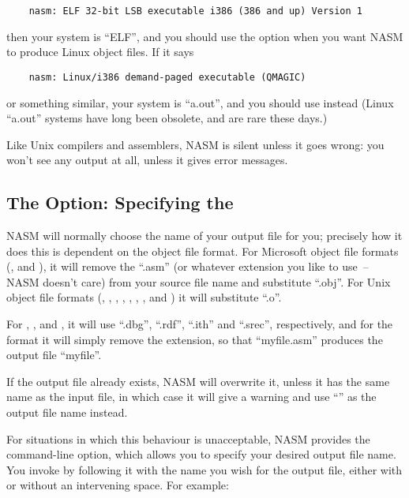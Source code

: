 \begin{lstlisting}
	nasm: ELF 32-bit LSB executable i386 (386 and up) Version 1
\end{lstlisting}

then your system is ``ELF'', and you should use the option 
when you want NASM to produce Linux object files. If it says

\begin{lstlisting}
	nasm: Linux/i386 demand-paged executable (QMAGIC)
\end{lstlisting}

or something similar, your system is ``a.out'', and you should use
 instead (Linux ``a.out'' systems have long been
obsolete, and are rare these days.)

Like Unix compilers and assemblers, NASM is silent unless it
goes wrong: you won't see any output at all, unless it gives error
messages.

\subsection{The  Option: Specifying the }
\label{subsec:opt-o}

NASM will normally choose the name of your output file for you;
precisely how it does this is dependent on the object file format.
For Microsoft object file formats (, 
and ), it will remove the ``.asm'' 
(or whatever extension you like to use~-- NASM doesn't care) from your
source file name and substitute ``.obj''. For Unix object file formats
(, , , , ,
, ,  and )
it will substitute ``.o''.

For , ,  and , it will use
``.dbg'', ``.rdf'', ``.ith'' and ``.srec'', respectively, and for
the  format it will simply remove the extension, so that
``myfile.asm'' produces the output file ``myfile''.

If the output file already exists, NASM will overwrite it, unless it
has the same name as the input file, in which case it will give a
warning and use ``'' as the output
file name instead.

For situations in which this behaviour is unacceptable, NASM
provides the  command-line option, which allows you to
specify your desired output file name. You invoke  by
following it with the name you wish for the output file, either
with or without an intervening space. For example:

